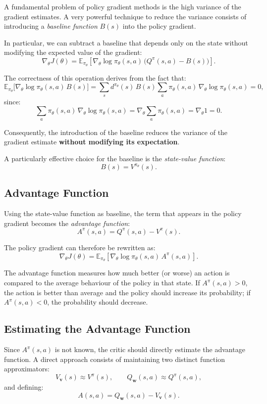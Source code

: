 A fundamental problem of policy gradient methods is the high variance of the gradient estimates. A very powerful technique to reduce the variance consists of introducing a \emph{baseline function} $B(s)$ into the policy gradient.

In particular, we can subtract a baseline that depends only on the state without modifying the expected value of the gradient:
\[
\nabla_\theta J(\theta)
= \mathbb{E}_{\pi_\theta}
\left[
\nabla_\theta \log \pi_\theta(s,a)\,\big(Q^\pi(s,a) - B(s)\big)
\right].
\]

The correctness of this operation derives from the fact that:
\[
\mathbb{E}_{\pi_\theta}
\big[
\nabla_\theta \log \pi_\theta(s,a)\, B(s)
\big]
=
\sum_{s} d^{\pi_\theta}(s)\, B(s)
\sum_{a} \pi_\theta(s,a)\, \nabla_\theta \log \pi_\theta(s,a)
= 0,
\]
since:
\[
\sum_{a} \pi_\theta(s,a)\, \nabla_\theta \log \pi_\theta(s,a)
= \nabla_\theta \sum_a \pi_\theta(s,a)
= \nabla_\theta 1
= 0.
\]

Consequently, the introduction of the baseline reduces the variance of the gradient estimate \textbf{without modifying its expectation}.

A particularly effective choice for the baseline is the \emph{state-value function}:
\[
B(s) = V^{\pi_\theta}(s).
\]

\subsection{Advantage Function}

Using the state-value function as baseline, the term that appears in the policy gradient becomes the \emph{advantage function}:
\[
A^{\pi}(s,a) = Q^{\pi}(s,a) - V^{\pi}(s).
\]

The policy gradient can therefore be rewritten as:
\[
\nabla_\theta J(\theta)
= \mathbb{E}_{\pi_\theta}
\left[
\nabla_\theta \log \pi_\theta(s,a)\, A^{\pi}(s,a)
\right].
\]

The advantage function measures how much better (or worse) an action is compared to the average behaviour of the policy in that state. If $A^{\pi}(s,a) > 0$, the action is better than average and the policy should increase its probability; if $A^{\pi}(s,a) < 0$, the probability should decrease.

\subsection{Estimating the Advantage Function}

Since $A^{\pi}(s,a)$ is not known, the critic should directly estimate the advantage function. A direct approach consists of maintaining two distinct function approximators:
\[
V_{\mathbf{v}}(s) \approx V^{\pi}(s), \qquad
Q_{\mathbf{w}}(s,a) \approx Q^{\pi}(s,a),
\]
and defining:
\[
A(s,a) = Q_{\mathbf{w}}(s,a) - V_{\mathbf{v}}(s).
\]


